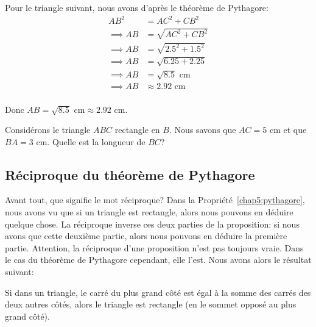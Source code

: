 \begin{exemple}
    Pour le triangle suivant, nous avons d'après le théorème de Pythagore:
    \begin{align*}
        AB^2 & = AC^2 + CB^2\\
        \implies AB & = \sqrt{AC^2 + CB^2}\\
        \implies AB & = \sqrt{2.5^2 + 1.5^2}\\
        \implies AB & = \sqrt{6.25 + 2.25}\\
        \implies AB & = \sqrt{8.5} \text{ cm}\\
        \implies AB & \approx 2.92 \text{ cm}\\
    \end{align*}

    Donc $AB = \sqrt{8.5} \text{ cm} \approx 2.92 \text{ cm}$. \hfill
\end{exemple}

\begin{exercicefr}
    Considérons le triangle $ABC$ rectangle en $B$. Nous savons que $AC = 5\text{ cm}$ et que $BA = 3 \text{ cm}$. Quelle est la longueur de $BC$?
\end{exercicefr}

\subsection{Réciproque du théorème de Pythagore}

Avant tout, que signifie le mot réciproque? Dans la Propriété~\ref{chap5:pythagore}, nous avons vu que si un triangle est rectangle, alors nous pouvons en déduire quelque chose. La réciproque inverse ces deux parties de la proposition: si nous avons que cette deuxième partie, alors nous pouvons en déduire la première partie. Attention, la réciproque d'une proposition n'est pas toujours vraie. Dans le cas du théorème de Pythagore cependant, elle l'est. Nous avons alors le résultat suivant:

\begin{propriete}\label{chap5:reciproque}
    Si dans un triangle, le carré du plus grand côté est égal à la somme des carrés des deux autres côtés, alors le triangle est rectangle (en le sommet opposé au plus grand côté).
\end{propriete}

